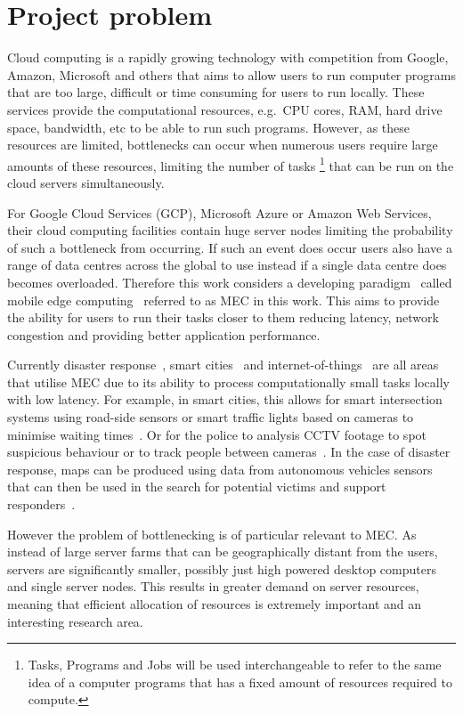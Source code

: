 \chapter{Project problem}\label{ch:project-problem}
Cloud computing is a rapidly growing technology with competition from Google, Amazon, Microsoft and others that aims to
allow users to run computer programs that are too large, difficult or time consuming for users to run locally.
These services provide the computational resources, e.g.\ CPU cores, RAM, hard drive space, bandwidth, etc
to be able to run such programs. However, as these resources are limited, bottlenecks can occur when
numerous users require large amounts of these resources, limiting the number of tasks
\footnote{Tasks, Programs and Jobs will be used interchangeable to refer to the same idea of a computer programs that
has a fixed amount of resources required to compute.} that can be run on the cloud servers simultaneously.

For Google Cloud Services (GCP), Microsoft Azure or Amazon Web Services, their cloud computing facilities contain huge
server nodes limiting the probability of such a bottleneck from occurring. If such an event does occur users also
have a range of data centres across the global to use instead if a single data centre does becomes overloaded.
Therefore this work considers a developing paradigm~\citep{mobile_edge_survey} called mobile edge
computing~\citep{hu2015mobile} referred to as MEC in this work. This aims to provide the ability for users to run their
tasks closer to them reducing latency, network congestion and providing better application performance.

Currently disaster response~\citep{mobile_edge_disaster}, smart cities~\citep{smart_disaster_management} and
internet-of-things~\citep{mobile_edge_IoT} are all areas that utilise MEC due to its ability
to process computationally small tasks locally with low latency. For example, in smart cities, this
allows for smart intersection systems using road-side sensors or smart traffic lights based
on cameras to minimise waiting times~\citep{smart_cities_traffic_lights}. Or for the police to analysis
CCTV footage to spot suspicious behaviour or to track people between cameras~\citep{Sreenu2019}. In the case
of disaster response, maps can be produced using data from autonomous vehicles sensors that can then be used in the
search for potential victims and support responders~\citep{smart_disaster_management}.

However the problem of bottlenecking is of particular relevant to MEC. As instead of large server farms
that can be geographically distant from the users, servers are significantly smaller, possibly
just high powered desktop computers and single server nodes. This results in greater demand on server resources,
meaning that efficient allocation of resources is extremely important and an interesting research area.

